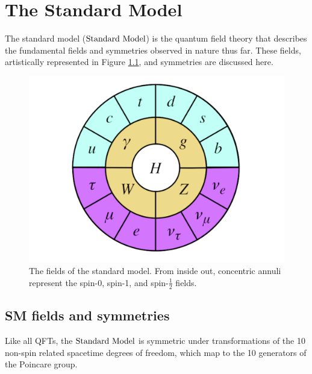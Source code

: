 \chapter{The Standard Model}
\label{chap:SM}
The standard model ($\text{Standard\ Model}$) is the quantum field theory that describes the fundamental fields and symmetries observed in nature thus far.  These fields, artistically represented in Figure \ref{fig:SMcircle}, and symmetries are discussed here. 
\begin{figure}[h]
\centering
\includegraphics[width=.6\linewidth]{figures/SM/StandardModel2.png}
\caption{The fields of the standard model. From inside out, concentric annuli represent the spin-0, spin-1, and spin-$\frac{1}{2}$ fields.}
\label{fig:SMcircle}
\end{figure}

\section{SM fields and symmetries}
Like all QFTs, the $\text{Standard\ Model}$ is symmetric under transformations of the 10 non-spin related spacetime degrees of freedom, which map to the 10 generators of the Poincare group. 

